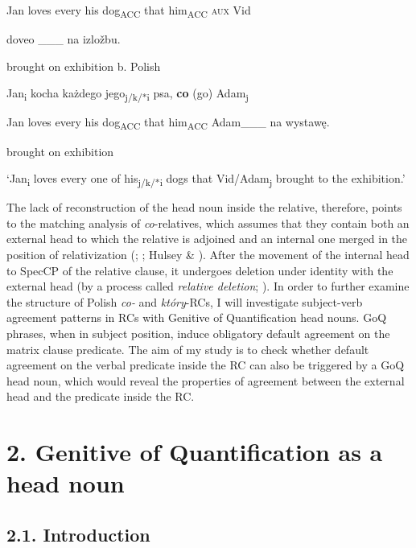 \documentclass[output=paper]{langsci/langscibook}
\begin{document}
Jan   loves every   his   dog\textsubscript{ACC}  that him\textsubscript{ACC} \textsc{aux}  Vid

doveo \_\_\_   na izložbu.    

    brought   on exhibition                  b.  Polish

    Jan\textsubscript{i} kocha   każdego   jego\textsubscript{j/k/*i} psa,   \textbf{co}  (go)     Adam\textsubscript{j}  

Jan  loves   every   his   dog\textsubscript{ACC}  that  him\textsubscript{ACC}  Adam \_\_\_     na wystawę.        

    brought   on exhibition          

    ‘Jan\textsubscript{i} loves every one of his\textsubscript{j/k/*i} dogs that Vid/Adam\textsubscript{j} brought to the exhibition.’

The lack of reconstruction of the head noun inside the relative, therefore, points to the matching analysis of \textit{co}{}-relatives, which assumes that they contain both an external head to which the relative is adjoined and an internal one merged in the position of relativization (\citealt{Bhatt2002}; \citealt{Sauerland2002}; Hulsey \& \citealt{Sauerland2006}). After the movement of the internal head to SpecCP of the relative clause, it undergoes deletion under identity with the external head (by a process called \textit{relative deletion}; \citealt{Sauerland2002}). In order to further examine the structure of Polish \textit{co{}-} and \textit{który}{}-RCs, I will investigate subject-verb agreement patterns in RCs with Genitive of Quantification head nouns. GoQ phrases, when in subject position, induce obligatory default agreement on the matrix clause predicate. The aim of my study is to check whether default agreement on the verbal predicate inside the RC can also be triggered by a GoQ head noun, which would reveal the properties of agreement between the external head and the predicate inside the RC.

\section{ 2. Genitive of Quantification as a head noun} 

\subsection{ 2.1. Introduction}
\end{document}
